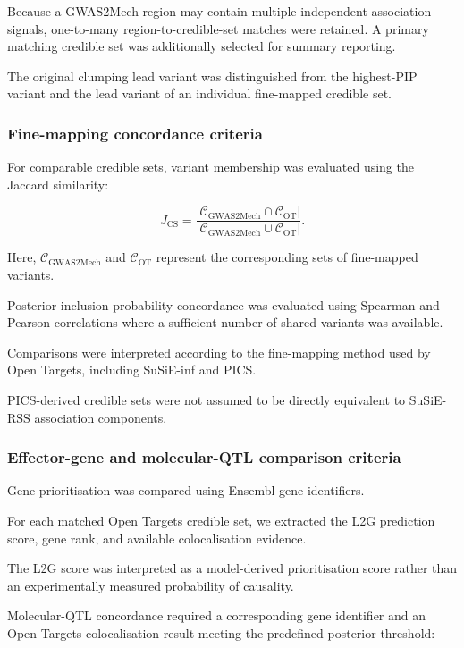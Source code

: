 \documentclass[11pt,a4paper]{article}
\begin{document}
Because a GWAS2Mech region may contain multiple
independent association signals, one-to-many
region-to-credible-set matches were retained.
A primary matching credible set was additionally
selected for summary reporting.

The original clumping lead variant was
distinguished from the highest-PIP variant
and the lead variant of an individual
fine-mapped credible set.

\subsubsection{Fine-mapping concordance criteria}

For comparable credible sets, variant membership
was evaluated using the Jaccard similarity:

\begin{equation}
J_{\mathrm{CS}} =
\frac{
|\mathcal{C}_{\mathrm{GWAS2Mech}}
\cap
\mathcal{C}_{\mathrm{OT}}|
}{
|\mathcal{C}_{\mathrm{GWAS2Mech}}
\cup
\mathcal{C}_{\mathrm{OT}}|
}.
\end{equation}

Here,
$\mathcal{C}_{\mathrm{GWAS2Mech}}$
and $\mathcal{C}_{\mathrm{OT}}$
represent the corresponding sets of
fine-mapped variants.

Posterior inclusion probability concordance
was evaluated using Spearman and Pearson
correlations where a sufficient number
of shared variants was available.

Comparisons were interpreted according to
the fine-mapping method used by Open Targets,
including SuSiE-inf and PICS.

PICS-derived credible sets were not assumed
to be directly equivalent to SuSiE-RSS
association components.

\subsubsection{Effector-gene and molecular-QTL comparison criteria}

Gene prioritisation was compared using
Ensembl gene identifiers.

For each matched Open Targets credible set,
we extracted the L2G prediction score,
gene rank, and available colocalisation evidence.

The L2G score was interpreted as a
model-derived prioritisation score rather
than an experimentally measured probability
of causality.

Molecular-QTL concordance required a
corresponding gene identifier and an
Open Targets colocalisation result meeting
the predefined posterior threshold:
\end{document}

